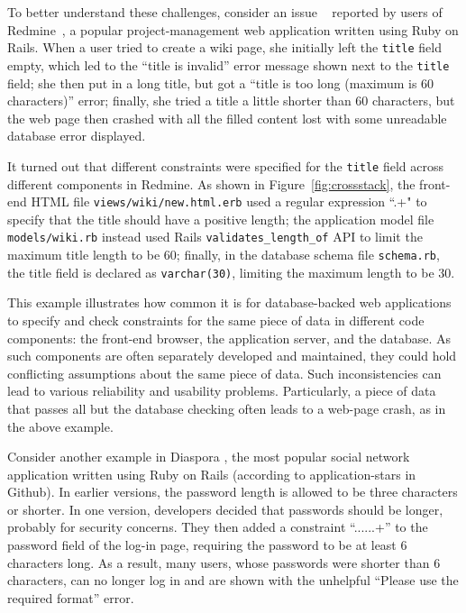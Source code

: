 To better understand these challenges, consider an issue ~\cite{redmine-24283} reported by users of Redmine~\cite{redmine}, a popular project-management web application written using Ruby on Rails.
When a user tried to create a wiki page, 
she initially left the {\tt title} field empty, which led to  the ``title is invalid'' error message shown
next to the {\tt title} field; she then put in a
long title, but got a 
``title is too long (maximum is 60 characters)'' error; finally, she tried a title a little shorter than 60 characters, but the web page then crashed with all the filled content lost with some unreadable database error displayed. 

It turned out that different constraints were specified for the {\tt title} field across different components in Redmine. As shown in Figure~\ref{fig:crossstack}, the front-end
HTML file {\tt views/wiki/new.html.erb} used a regular expression ``.+" 
to specify that the title should have a positive length; 
the application model file {\tt models/wiki.rb} instead used Rails 
{\tt validates\_length\_of} API to limit the maximum title length to be 60; finally, in the database schema file {\tt schema.rb}, the title field is declared as {\tt varchar(30)}, limiting the maximum length to be 30.
 
 This example illustrates how common it is 
 for database-backed web applications to specify and check constraints
 for the same piece of data in different code components: the front-end 
 browser, the application server, and the database.
As such components are often separately developed and maintained, they
could hold conflicting assumptions about the same piece of data. Such  inconsistencies can lead to various reliability and usability problems. Particularly, a 
 piece of data that passes all but the database checking
often leads to a web-page crash, as in the above example. 


Consider another example in Diaspora \cite{Diaspora-4123}, the most  popular social
network application written using Ruby on Rails (according to
application-stars in Github). In earlier versions, the password length is allowed to be three characters or shorter. In one version, 
developers decided that passwords should be longer, probably for security concerns. They then added a constraint ``......+'' to the password field of
the log-in page, requiring the password to be at least 6 characters long.
As a result, many users, whose
passwords were shorter than 6 characters, can no longer log in and are shown with the unhelpful ``Please use the required format'' error.

